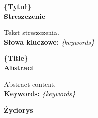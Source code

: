 \clearpage
{}
\newpage
\clearpage
{}
\begin{center}
	\fontsize{18pt}{12pt}\selectfont\textbf{\{Tytuł\}}\\
	\vspace{1cm}
	\fontsize{14pt}{12pt}\selectfont
	\textbf{Streszczenie}
\end{center}
Tekst streszczenia.\\
\noindent\textbf{Słowa kluczowe:} \textit{\{keywords\}}\\
\vspace{1.5cm}

\begin{center}
	\fontsize{18pt}{12pt}\selectfont\textbf{\{Title\}}\\
	\vspace{1cm}
	\fontsize{14pt}{12pt}\selectfont
	\textbf{Abstract}
\end{center}
Abstract content.\\
\noindent\textbf{Keywords:} \textit{\{keywords\}}\\
\vspace{1.5cm}

\newpage
\begin{center}
	\textbf{Życiorys}
\end{center}
\vspace{1cm}
\lipsum[4-5]


\begin{abstract}
TBA \LaTeX
\end{abstract}